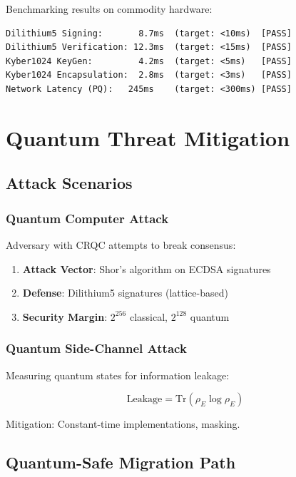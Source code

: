 \documentclass[11pt,a4paper]{article}
\begin{document}
Benchmarking results on commodity hardware:

\begin{lstlisting}[caption=Performance Benchmarks]
Dilithium5 Signing:       8.7ms  (target: <10ms)  [PASS]
Dilithium5 Verification: 12.3ms  (target: <15ms)  [PASS]
Kyber1024 KeyGen:         4.2ms  (target: <5ms)   [PASS]
Kyber1024 Encapsulation:  2.8ms  (target: <3ms)   [PASS]
Network Latency (PQ):   245ms    (target: <300ms) [PASS]
\end{lstlisting}

\section{Quantum Threat Mitigation}

\subsection{Attack Scenarios}

\subsubsection{Quantum Computer Attack}

Adversary with CRQC attempts to break consensus:

\begin{enumerate}
    \item \textbf{Attack Vector}: Shor's algorithm on ECDSA signatures
    \item \textbf{Defense}: Dilithium5 signatures (lattice-based)
    \item \textbf{Security Margin}: $2^{256}$ classical, $2^{128}$ quantum
\end{enumerate}

\subsubsection{Quantum Side-Channel Attack}

Measuring quantum states for information leakage:

\begin{equation}
\text{Leakage} = \text{Tr}(\rho_E \log \rho_E)
\end{equation}

Mitigation: Constant-time implementations, masking.

\subsection{Quantum-Safe Migration Path}
\end{document}

